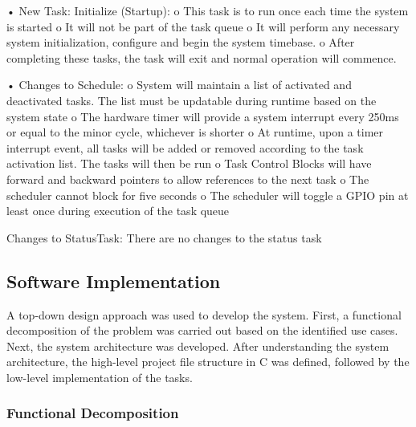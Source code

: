 \documentclass[12pt]{article} %
\begin{document}
\begin{itemize}
•	New Task: Initialize (Startup):
o	This task is to run once each time the system is started
o	It will not be part of the task queue
o	It will perform any necessary system initialization, configure and begin the system timebase.
o	After completing these tasks, the task will exit and normal operation will commence.

•	Changes to Schedule:
o	System will maintain a list of activated and deactivated tasks. The list must be updatable during runtime based on the system state
o	The hardware timer will provide a system interrupt every 250ms or equal to the minor cycle, whichever is shorter
o	At runtime, upon a timer interrupt event, all tasks will be added or removed according to the task activation list. The tasks will then be run
o	Task Control Blocks will have forward and backward pointers to allow references to the next task
o	The scheduler cannot block for five seconds
o	The scheduler will toggle a GPIO pin at least once during execution of the task queue	

	Changes to StatusTask:
	There are no changes to the status task
\end{itemize}

\subsection{Software Implementation}

A top-down design approach was used to develop the system.  First, a functional decomposition of the problem was carried out based on the identified use cases.  Next, the system architecture was developed.  After understanding the system architecture, the high-level project file structure in C was defined, followed by the low-level implementation of the tasks.

\subsubsection{Functional Decomposition}

\end{document}
